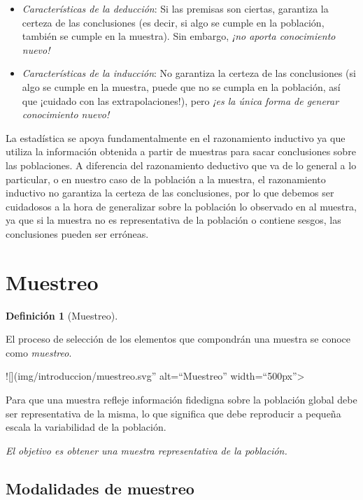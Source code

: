\documentclass[
  a4paper,
]{scrreport}
\theoremstyle{plain}
\theoremstyle{definition}
\theoremstyle{definition}
\newtheorem{definition}{Definición}[chapter]
\theoremstyle{remark}
\begin{document}
\begin{itemize}
\item
  \emph{Características de la deducción}: Si las premisas son ciertas,
  garantiza la certeza de las conclusiones (es decir, si algo se cumple
  en la población, también se cumple en la muestra). Sin embargo,
  \emph{¡no aporta conocimiento nuevo!}
\item
  \emph{Características de la inducción}: No garantiza la certeza de las
  conclusiones (si algo se cumple en la muestra, puede que no se cumpla
  en la población, así que ¡cuidado con las extrapolaciones!), pero
  \emph{¡es la única forma de generar conocimiento nuevo!}
\end{itemize}

La estadística se apoya fundamentalmente en el razonamiento inductivo ya
que utiliza la información obtenida a partir de muestras para sacar
conclusiones sobre las poblaciones. A diferencia del razonamiento
deductivo que va de lo general a lo particular, o en nuestro caso de la
población a la muestra, el razonamiento inductivo no garantiza la
certeza de las conclusiones, por lo que debemos ser cuidadosos a la hora
de generalizar sobre la población lo observado en al muestra, ya que si
la muestra no es representativa de la población o contiene sesgos, las
conclusiones pueden ser erróneas.

\section{Muestreo}\label{muestreo}

\begin{definition}[Muestreo]\protect\hypertarget{def-muestreo}{}\label{def-muestreo}

El proceso de selección de los elementos que compondrán una muestra se
conoce como \emph{muestreo}.

\end{definition}

!{[}{]}(img/introduccion/muestreo.svg'' alt=``Muestreo''
width=``500px''\textgreater{}

Para que una muestra refleje información fidedigna sobre la población
global debe ser representativa de la misma, lo que significa que debe
reproducir a pequeña escala la variabilidad de la población.

\emph{El objetivo es obtener una muestra representativa de la
población.}

\subsection{Modalidades de muestreo}\label{modalidades-de-muestreo}
\end{document}
